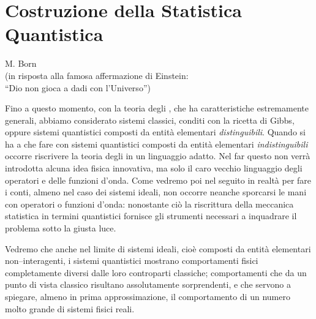 \chapter{Costruzione della Statistica Quantistica}
\label{cap:quantistica}

\begin{minipage}{0.35\textwidth}\end{minipage}\hfill
\begin{minipage}{0.65\textwidth}

\vskip 0.25cm
M. Born\\
(in risposta alla famosa affermazione di Einstein:\\
``Dio non gioca a dadi con l'Universo'')
\end{minipage}
\vskip 1.0cm

Fino a questo momento, con la teoria degli \ensembles, che ha caratteristiche estremamente generali, abbiamo considerato sistemi classici, conditi con la ricetta di Gibbs, oppure sistemi quantistici composti da entità elementari {\em distinguibili}. Quando si ha a che fare con sistemi quantistici composti da entità elementari {\em indistinguibili} occorre riscrivere la teoria degli \ensembles in un linguaggio adatto. Nel far questo non verrà introdotta alcuna idea fisica innovativa, ma solo il caro vecchio linguaggio degli operatori e delle funzioni d'onda. Come vedremo poi nel seguito in realtà per fare i conti, almeno nel caso dei sistemi ideali, non occorre neanche sporcarsi le mani con operatori o funzioni d'onda: nonostante ciò la riscrittura della meccanica statistica in termini quantistici fornisce gli strumenti necessari a inquadrare il problema sotto la giusta luce.

Vedremo che anche nel limite di sistemi ideali, cioè composti da entità elementari non--interagenti, i sistemi quantistici mostrano comportamenti fisici completamente diversi dalle loro controparti classiche; comportamenti che da un punto di vista classico risultano assolutamente sorprendenti, e che servono a spiegare, almeno in prima approssimazione, il comportamento di un numero molto grande di sistemi fisici reali.

